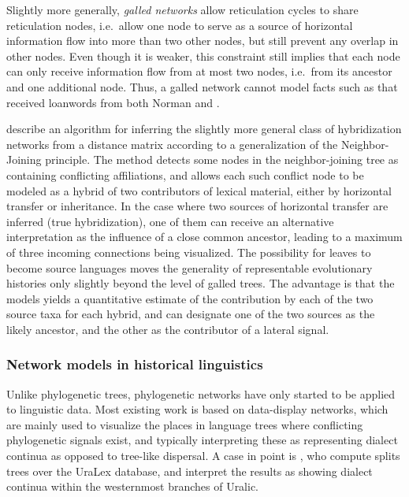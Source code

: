 Slightly more generally, \textit{galled networks} allow reticulation cycles to share reticulation nodes, i.e.\ allow one node to serve as a source of horizontal information flow into more than two other nodes, but still prevent any overlap in other nodes. Even though it is weaker, this constraint still implies that each node can only receive information flow from at most two nodes, i.e.\ from its ancestor and one additional node. Thus, a galled network cannot model facts such as that  received loanwords from both Norman  and .

\citet{willems_ea_2014} describe an algorithm for inferring the slightly more general class of hybridization networks from a distance matrix according to a generalization of the Neighbor-Joining principle. The method detects some nodes in the neighbor-joining tree as containing conflicting affiliations, and allows each such conflict node to be modeled as a hybrid of two contributors of lexical material, either by horizontal transfer or inheritance. In the case where two sources of horizontal transfer are inferred (true hybridization), one of them can receive an alternative interpretation as the influence of a close common ancestor, leading to a maximum of three incoming connections being visualized. The possibility for leaves to become source languages moves the generality of representable evolutionary histories only slightly beyond the level of galled trees. The advantage is that the models yields a quantitative estimate of the contribution by each of the two source taxa for each 
hybrid, and can designate one of the two sources as the likely ancestor, and the other as the contributor of a lateral signal.

\subsubsection{Network models in historical linguistics}
Unlike phylogenetic trees, phylogenetic networks have only started to be applied to linguistic data. Most existing work is based on data-display networks, which are mainly used to visualize the places in language trees where conflicting phylogenetic signals exist, and typically interpreting these as representing dialect continua as opposed to tree-like dispersal. A case in point is \citet{lehtinen_ea_2014}, who compute splits trees over the UraLex database, and interpret the results as showing dialect continua within the westernmost branches of Uralic.

